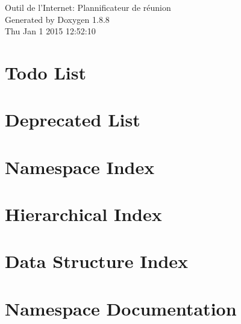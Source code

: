 \documentclass[twoside]{book}
\newcommand{\+}{\discretionary{\mbox{\scriptsize$\hookleftarrow$}}{}{}}
\newcommand{\clearemptydoublepage}{%
  \newpage{\pagestyle{empty}\cleardoublepage}%
}
\begin{document}
\begin{titlepage}
\vspace*{7cm}
\begin{center}%
{\Large Outil de l'Internet\+: Plannificateur de réunion }\\
\vspace*{1cm}
{\large Generated by Doxygen 1.8.8}\\
\vspace*{0.5cm}
{\small Thu Jan 1 2015 12:52:10}\\
\end{center}
\end{titlepage}
\clearemptydoublepage
\tableofcontents
\clearemptydoublepage
{}

\chapter{Todo List}
\label{todo}

\chapter{Deprecated List}
\label{deprecated}

\chapter{Namespace Index}

\chapter{Hierarchical Index}

\chapter{Data Structure Index}

\chapter{Namespace Documentation}



























\end{document}
